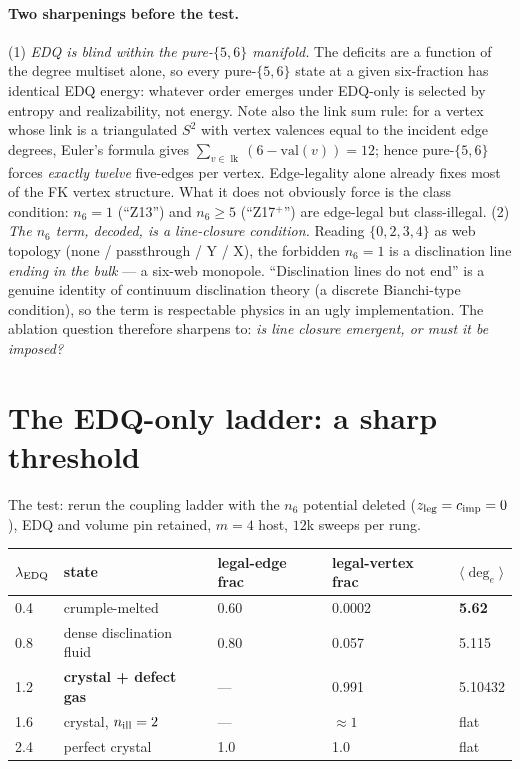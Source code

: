 \documentclass[11pt]{article}
\newcommand{\Nfk}{n_6}
\DeclareMathOperator{\lk}{lk}
\begin{document}
\paragraph{Two sharpenings before the test.}
(1) \emph{EDQ is blind within the pure-$\{5,6\}$ manifold.} The deficits are
a function of the degree multiset alone, so every pure-$\{5,6\}$ state at a
given six-fraction has identical EDQ energy: whatever order emerges under
EDQ-only is selected by entropy and realizability, not energy. Note also
the link sum rule: for a vertex whose link is a triangulated $S^2$ with
vertex valences equal to the incident edge degrees, Euler's formula gives
$\sum_{v \in \lk} (6 - \mathrm{val}(v)) = 12$; hence pure-$\{5,6\}$ forces
\emph{exactly twelve} five-edges per vertex. Edge-legality alone already
fixes most of the FK vertex structure. What it does not obviously force is
the class condition: $\Nfk = 1$ (``Z13'') and $\Nfk \geq 5$ (``Z17$^+$'')
are edge-legal but class-illegal.
(2) \emph{The $n_6$ term, decoded, is a line-closure condition.} Reading
$\{0,2,3,4\}$ as web topology (none / passthrough / Y / X), the forbidden
$\Nfk = 1$ is a disclination line \emph{ending in the bulk} --- a six-web
monopole. ``Disclination lines do not end'' is a genuine identity of
continuum disclination theory (a discrete Bianchi-type condition), so the
term is respectable physics in an ugly implementation. The ablation question
therefore sharpens to: \emph{is line closure emergent, or must it be
imposed?}

\section{The EDQ-only ladder: a sharp threshold}
\label{sec:ladder}

The test: rerun the coupling ladder with the $n_6$ potential deleted
($z_{\rm leg} = c_{\rm imp} = 0$), EDQ and volume pin retained, $m=4$ host,
$12$k sweeps per rung.

\begin{center}
\begin{tabular}{lllll}
\toprule
$\lambda_{\rm EDQ}$ & state & legal-edge frac & legal-vertex frac & $\langle \deg_e\rangle$ \\
\midrule
0.4 & crumple-melted & 0.60 & 0.0002 & \textbf{5.62} \\
0.8 & dense disclination fluid & 0.80 & 0.057 & 5.115 \\
1.2 & \textbf{crystal + defect gas} & --- & 0.991 & 5.10432 \\
1.6 & crystal, $n_{\rm ill}=2$ & --- & $\approx 1$ & flat \\
2.4 & perfect crystal & 1.0 & 1.0 & flat \\
\bottomrule
\end{tabular}
\end{center}
\end{document}
